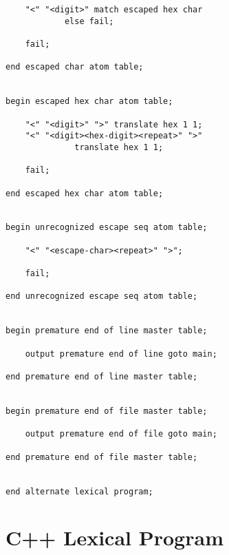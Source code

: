 \documentclass[12pt]{article}
\newenvironment{indpar}[1][0.3in]%
	{\begin{list}{}%
		     {\setlength{\itemsep}{0in}%
		      \setlength{\topsep}{0in}%
		      \setlength{\parsep}{1ex}%
		      \setlength{\labelwidth}{#1}%
		      \setlength{\leftmargin}{#1}%
		      \addtolength{\leftmargin}{\labelsep}}%
	 \item}%
	{\end{list}}
\begin{document}
\begin{indpar}
\begin{verbatim}
    "<" "<digit>" match escaped hex char
            else fail;

    fail;

end escaped char atom table;


begin escaped hex char atom table;

    "<" "<digit>" ">" translate hex 1 1;
    "<" "<digit><hex-digit><repeat>" ">"
              translate hex 1 1;

    fail;

end escaped hex char atom table;


begin unrecognized escape seq atom table;

    "<" "<escape-char><repeat>" ">";

    fail;

end unrecognized escape seq atom table;


begin premature end of line master table;

    output premature end of line goto main;

end premature end of line master table;


begin premature end of file master table;

    output premature end of file goto main;

end premature end of file master table;


end alternate lexical program;
\end{verbatim}
\end{indpar}

\newpage

\section{C++ Lexical Program}
\label{C++-LEXICAL-PROGRAM}
\end{document}
